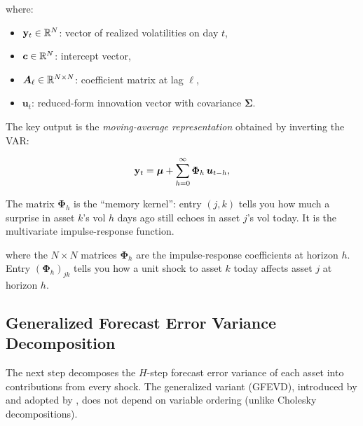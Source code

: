 where:
\begin{itemize}[nosep]
  \item $\mathbf{y}_t \in \mathbb{R}^N$: vector of realized volatilities on day $t$,
  \item $\bm{c} \in \mathbb{R}^N$: intercept vector,
  \item $\bm{A}_\ell \in \mathbb{R}^{N \times N}$: coefficient matrix at lag $\ell$,
  \item $\bm{u}_t$: reduced-form innovation vector with covariance $\bm{\Sigma}$.
\end{itemize}

The key output is the \emph{moving-average representation} obtained by inverting the
VAR:

\begin{equation}\label{eq:var-ma}
  \mathbf{y}_t = \bm{\mu} + \sum_{h=0}^{\infty} \bm{\Phi}_h \, \bm{u}_{t-h},
\end{equation}

\begin{intuition}
The matrix $\bm{\Phi}_h$
is the ``memory kernel'': entry $(j,k)$ tells you how much a surprise in asset $k$'s
vol $h$ days ago still echoes in asset $j$'s vol today.  It is the multivariate
impulse-response function.
\end{intuition}

where the $N \times N$ matrices $\bm{\Phi}_h$ are the impulse-response coefficients
at horizon $h$.  Entry $(\bm{\Phi}_h)_{jk}$ tells you how a unit shock to asset $k$
today affects asset $j$ at horizon $h$.

\subsection{Generalized Forecast Error Variance Decomposition}

The next step decomposes the $H$-step forecast error variance of each asset into
contributions from every shock.  The generalized variant (GFEVD), introduced by
\citet{PesaranShin1998} and adopted by \citet{DieboldYilmaz2012}, does not depend
on variable ordering (unlike Cholesky decompositions).

